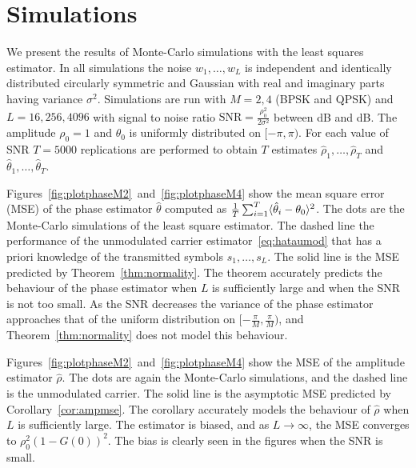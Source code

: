 \documentclass[conference]{IEEEtran}
\begin{document}
\section{Simulations}\label{sec:simulations}

We present the results of Monte-Carlo simulations with the least squares estimator.  In all simulations the noise $w_1,\dots,w_L$ is independent and identically distributed circularly symmetric and Gaussian with real and imaginary parts having variance $\sigma^2$.  Simulations are run with $M=2,4$ (BPSK and QPSK) and $L=16,256,4096$ with signal to noise ratio $\text{SNR} = \tfrac{\rho_0^2}{2\sigma^2}$ between \unit[-20]{dB} and \unit[20]{dB}.  The amplitude $\rho_0=1$ and $\theta_0$ is uniformly distributed on $[-\pi, \pi)$.  For each value of SNR $T = 5000$ replications are performed to obtain $T$ estimates $\hat{\rho}_1, \dots, \hat{\rho}_T$ and $\hat{\theta}_1, \dots, \hat{\theta}_T$.  

Figures~\ref{fig:plotphaseM2}~and~\ref{fig:plotphaseM4} show the mean square error (MSE) of the phase estimator $\hat{\theta}$ computed as $\tfrac{1}{T}\sum_{i=1}^T\langle \hat{\theta}_i - \theta_0 \rangle^2$.  The dots are the Monte-Carlo simulations of the least square estimator.  The dashed line the performance of the unmodulated carrier estimator~\eqref{eq:hataumod} that has a priori knowledge of the transmitted symbols $s_1, \dots, s_L$.  %
The solid line is the MSE predicted by Theorem~\ref{thm:normality}.  The theorem accurately predicts the behaviour of the phase estimator when $L$ is sufficiently large and when the SNR is not too small.  As the SNR decreases the variance of the phase estimator approaches that of the uniform distribution on $[-\tfrac{\pi}{M}, \tfrac{\pi}{M})$, and Theorem~\ref{thm:normality} does not model this behaviour.  %

Figures~\ref{fig:plotphaseM2}~and~\ref{fig:plotphaseM4} show the MSE of the amplitude estimator $\hat{\rho}$.  The dots are again the Monte-Carlo simulations, and the dashed line is the unmodulated carrier.  The solid line is the asymptotic MSE predicted by Corollary~\ref{cor:ampmse}.  The corollary accurately models the behaviour of $\hat{\rho}$ when $L$ is sufficiently large.  The estimator is biased, and as $L\rightarrow\infty$, the MSE converges to $\rho_0^2(1 - G(0))^2$.  The bias is clearly seen in the figures when the SNR is small.
\end{document}
